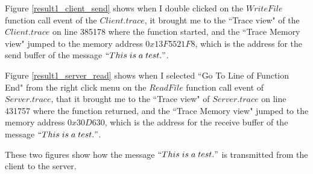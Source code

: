 Figure \ref{result1_client_send} shows when I double clicked on the $WriteFile$ function call event of the $Client.trace$, it brought me to the ``Trace view" of the $Client.trace$ on line 385178 where the function started, and the ``Trace Memory view" jumped to the memory address $0x13F5521F8$, which is the address for the send buffer of the message $``This\; is\; a\; test."$.

Figure \ref{result1_server_read} shows when I selected ``Go To Line of Function End" from the right click menu on the $ReadFile$ function call event of $Server.trace$, that it brought me to the ``Trace view" of $Server.trace$ on line 431757 where the function returned, and the ``Trace Memory view" jumped to the memory address $0x30D630$, which is the address for the receive buffer of the message $``This\; is\; a\; test."$.

These two figures show how the message $``This\; is\; a\; test."$ is transmitted from the client to the server.

